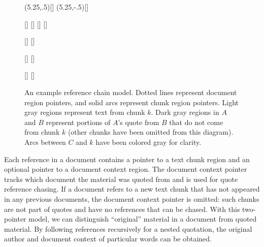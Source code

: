 \documentclass{acm_proc_article-sp}
\begin{document}
\begin{figure*}[t]
\begin{center}
\begin{graph}
(5.25,.5)[]
(5.25,-.5)[]




[]
[]
[]
[]

[]
[]

[]
[]


[]
[]


\end{graph}

\caption{An example reference chain model.  Dotted lines represent document region pointers, and solid arcs represent chunk region pointers.  Light gray regions represent text from chunk $k$.  Dark gray regions in $A$ and $B$ represent portions of $A$'s quote from $B$ that do not come from chunk $k$ (other chunks have been omitted from this diagram).  Arcs between $C$ and $k$ have been colored gray for clarity.}
\label{fig:referenceChain}

\end{center}

\end{figure*}






Each reference in a document contains a pointer to a text chunk region and an optional pointer to a document context region.
The document context pointer tracks which document the material was quoted from and is used for quote reference chasing.
If a document refers to a new text chunk that has not appeared in any previous documents, the document context pointer is omitted:  such chunks are not part of quotes and have no references that can be chased.
With this two-pointer model, we can distinguish ``original'' material in a document from quoted material.  %
By following references recursively for a nested quotation, the original author and document context of particular words can be obtained.
\end{document}
